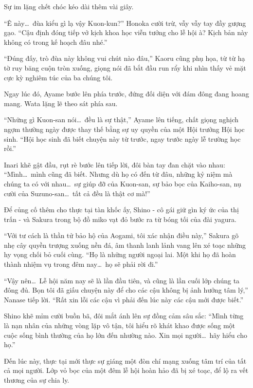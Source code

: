 \documentclass[../main.tex]{subfiles}
\begin{document}
Sự im lặng chết chóc kéo dài thêm vài giây.

``Ê này\dots\ đùa kiểu gì lạ vậy Kuon-kun?'' Honoka cười trừ, vẫy vẫy tay đầy gượng gạo. ``Cậu định đóng tiếp vở kịch khoa học viễn tưởng cho lễ hội à? Kịch bản này không có trong kế hoạch đâu nhé.''

``Đúng đấy, trò đùa này không vui chút nào đâu,'' Kaoru cũng phụ họa, từ từ hạ tờ ruy băng cuộn tròn xuống, giọng nói đã bắt đầu run rẩy khi nhìn thấy vẻ mặt cực kỳ nghiêm túc của ba chúng tôi.

Ngay lúc đó, Ayame bước lên phía trước, đứng đối diện với đám đông đang hoang mang. Wata lặng lẽ theo sát phía sau.

``Những gì Kuon-san nói\dots\ đều là sự thật,'' Ayame lên tiếng, chất giọng nghịch ngợm thường ngày được thay thế bằng sự uy quyền của một Hội trưởng Hội học sinh. ``Hội học sinh đã biết chuyện này từ trước, ngay trước ngày lễ trường học rồi.''

Inari khẽ gật đầu, rụt rè bước lên tiếp lời, đôi bàn tay đan chặt vào nhau: ``Mình\dots\ mình cũng đã biết. Nhưng dù họ có đến từ đâu, những kỷ niệm mà chúng ta có với nhau\dots\ sự giúp đỡ của Kuon-san, sự bảo bọc của Kaiho-san, nụ cười của Suzuno-san\dots\ tất cả đều là thật cơ mà!''

Để củng cố thêm cho thực tại tàn khốc ấy, Shino - cô gái giữ gìn ký ức của thị trấn - và Sakura trong bộ đồ miko vạt đỏ bước ra từ bóng tối của đài yagura.

``Với tư cách là thần tử bảo hộ của Aogami, tôi xác nhận điều này,'' Sakura gõ nhẹ cây quyền trượng xuống nền đá, âm thanh lanh lảnh vang lên xé toạc những hy vọng chối bỏ cuối cùng. ``Họ là những người ngoại lai. Một khi họ đã hoàn thành nhiệm vụ trong đêm nay\dots\ họ sẽ phải rời đi.''

``Vậy nên\dots\ Lễ hội năm nay sẽ là lần đầu tiên, và cũng là lần cuối lớp chúng ta đông đủ. Bọn tôi đã giấu chuyện này để cho các cậu không bị ảnh hưởng tâm lý,'' Nanase tiếp lời. ``Rất xin lỗi các cậu vì phải đến lúc này các cậu mới được biết.''

Shino khẽ mỉm cười buồn bã, đôi mắt ánh lên sự đồng cảm sâu sắc: ``Mình từng là nạn nhân của những vòng lặp vô tận, tôi hiểu rõ khát khao được sống một cuộc sống bình thường của họ lớn đến nhường nào. Xin mọi người\dots\ hãy hiểu cho họ.''

Đến lúc này, thực tại mới thực sự giáng một đòn chí mạng xuống tâm trí của tất cả mọi người. Lớp vỏ bọc của một đêm lễ hội hoàn hảo đã bị xé toạc, để lộ ra vết thương của sự chia ly.
\end{document}
